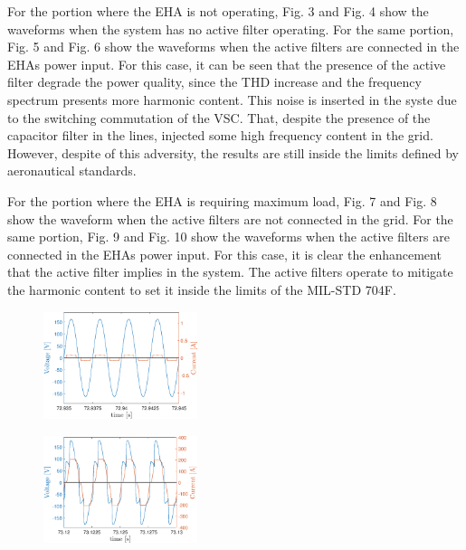 For the portion where the EHA is not operating, Fig. 3 and Fig. 4 show the waveforms when the system has no active filter operating. For the same portion, Fig. 5 and Fig. 6 show the waveforms when the active filters are connected in the EHAs power input. For this case, it can be seen that the presence of the active filter degrade the power quality, since the THD increase and the frequency spectrum presents more harmonic content. This noise is inserted in the syste due to the switching commutation of the VSC. That, despite the presence of the capacitor filter in the lines, injected some high frequency content in the grid. However, despite of this adversity, the results are still inside the limits defined by aeronautical standards.

For the portion where the EHA is requiring maximum load, Fig. 7 and Fig. 8 show the waveform when the active filters are not connected in the grid. For the same portion, Fig. 9 and Fig. 10 show the waveforms when the active filters are connected in the EHAs power input. For this case, it is clear the enhancement that the active filter implies in the system. The active filters operate to mitigate the harmonic content to set it inside the limits of the MIL-STD 704F.

\begin{figure}[!b] %
	\centering
	\includegraphics[width=0.4\textwidth]{Figures/artigo_unfilt_1.eps}
	\caption{}
	\label{fig:artigo_unfilt_1.eps}
\end{figure}

\begin{figure}[!b] %
	\centering
	\includegraphics[width=0.4\textwidth]{Figures/artigo_unfilt_2.eps}
	\caption{}
	\label{fig:artigo_unfilt_2.eps}
\end{figure}

